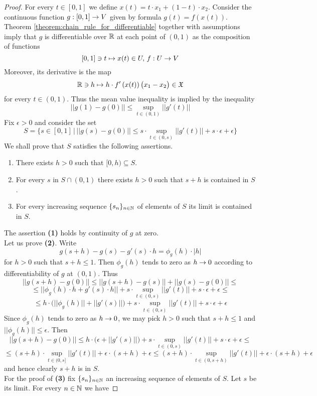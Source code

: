 \begin{proof}
For every $t\in [0,1]$ we define $x(t) = t\cdot x_1 + (1-t)\cdot x_2$. Consider the continuous function $g:[0,1] \rightarrow V$ given by formula $g(t) = f\left(x(t)\right)$. Theorem \ref{theorem:chain_rule_for_differentiable} together with assumptions imply that $g$ is differentiable over ${\mathbb R}$ at each point of $(0,1)$ as the composition of functions
$$[0,1]\ni t\mapsto x(t) \in U,\,f:U\rightarrow V$$
Moreover, its derivative is the map
$${\mathbb R}\ni h \mapsto h\cdot f'\left(x(t)\right)\big(x_1 - x_2\big) \in {\mathfrak X}$$
for every $t\in (0,1)$. Thus the mean value inequality is implied by the inequality
$$||g(1) - g(0)||\leq \sup_{t\in (0,1)}\big|\big|g'(t)\big|\big|$$
Fix $\epsilon > 0$ and consider the set
$$S = \bigg\{s\in [0,1]\,\bigg|\,||g(s) - g(0)||\leq s\cdot \sup_{t\in (0,s)}||g'(t)||+ s\cdot \epsilon + \epsilon\bigg\}$$
We shall prove that $S$ satisfies the following assertions.
\begin{enumerate}[label=\textbf{(\arabic*)}, leftmargin=*]
\item There exists $h> 0$ such that $[0,h)\subseteq S$. 
\item For every $s$ in $S \cap (0,1)$ there exists $h > 0$ such that $s+h$ is contained in $S$.
\item For every increasing sequence $\{s_n\}_{n\in {\mathbb N}}$ of elements of $S$ its limit is contained in $S$.
\end{enumerate}
The assertion \textbf{(1)} holds by continuity of $g$ at zero.\\
Let us prove \textbf{(2)}. Write
$$g(s+h) - g(s) - g'(s)\cdot h = \phi_g(h)\cdot |h|$$
for $h > 0$ such that $s + h \leq 1$. Then $\phi_g(h)$ tends to zero as $h\rightarrow 0$ according to differentiability of $g$ at $(0,1)$. Thus
$$||g(s+h) - g(0)|| \leq ||g(s+h) - g(s)|| + ||g(s) - g(0)|| \leq$$
$$\leq ||\phi_g(h)\cdot h + g'(s)\cdot h|| + s\cdot \sup_{t\in (0,s)}||g'(t)||+ s\cdot \epsilon + \epsilon \leq$$
$$\leq h\cdot \bigg(||\phi_g(h)|| + ||g'(s)||\bigg) + s\cdot \sup_{t\in (0,s)}||g'(t)||+ s\cdot \epsilon + \epsilon$$
Since $\phi_g(h)$ tends to zero as $h\rightarrow 0$, we may pick $h > 0$ such that $s + h \leq 1$ and $||\phi_g(h)|| \leq \epsilon$. Then
$$||g(s+h) - g(0)|| \leq h\cdot \bigg(\epsilon + ||g'(s)||\bigg) + s\cdot \sup_{t\in (0,s)}||g'(t)||+ s\cdot \epsilon + \epsilon \leq$$
$$\leq (s+h)\cdot \sup_{t\in (0,s]}||g'(t)|| + \epsilon \cdot (s + h) + \epsilon \leq (s+h)\cdot \sup_{t\in (0,s+h)}||g'(t)|| + \epsilon \cdot (s + h) + \epsilon$$
and hence clearly $s+h$ is in $S$.\\
For the proof of \textbf{(3)} fix $\{s_n\}_{n\in {\mathbb N}}$ an increasing sequence of elements of $S$. Let $s$ be its limit. For every $n\in {\mathbb N}$ we have

\end{proof}
